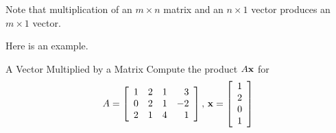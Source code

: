 Note that multiplication of an $m \times n$ matrix and an $n \times 1$ vector produces an $m \times 1$ vector.

Here is an example.

\begin{example}{A Vector Multiplied by a Matrix}\label{exa:vectormultbymatrix}
Compute the product $A\mathbf{x}$ for 
\begin{equation*}
A = \left[
\begin{array}{rrrr}
1 & 2 & 1 & 3 \\
0 & 2 & 1 & -2 \\
2 & 1 & 4 & 1
\end{array}
\right],\,  \mathbf{x} =  \left[
\begin{array}{r}
1 \\
2 \\
0 \\
1
\end{array}
\right] 
\end{equation*}
\end{example}

